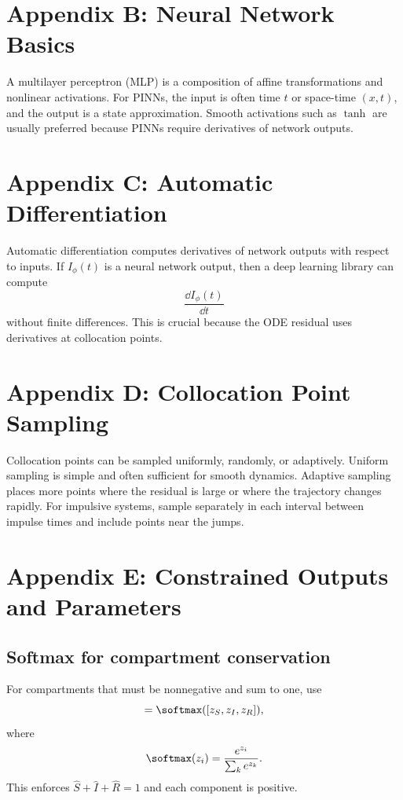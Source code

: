 \documentclass[11pt,a4paper]{article}
\begin{document}
\section{Appendix B: Neural Network Basics}
A multilayer perceptron (MLP) is a composition of affine transformations and nonlinear activations. For PINNs, the input is often time $t$ or space-time $(x,t)$, and the output is a state approximation. Smooth activations such as $\tanh$ are usually preferred because PINNs require derivatives of network outputs.

\section{Appendix C: Automatic Differentiation}
\label{app:autodiff}
Automatic differentiation computes derivatives of network outputs with respect to inputs. If $I_\phi(t)$ is a neural network output, then a deep learning library can compute
\begin{equation}
    \frac{\dd I_\phi(t)}{\dd t}
\end{equation}
without finite differences. This is crucial because the ODE residual uses derivatives at collocation points.

\section{Appendix D: Collocation Point Sampling}
Collocation points can be sampled uniformly, randomly, or adaptively. Uniform sampling is simple and often sufficient for smooth dynamics. Adaptive sampling places more points where the residual is large or where the trajectory changes rapidly. For impulsive systems, sample separately in each interval between impulse times and include points near the jumps.

\section{Appendix E: Constrained Outputs and Parameters}
\label{app:constraints}
\subsection{Softmax for compartment conservation}
For compartments that must be nonnegative and sum to one, use
\begin{equation}
    [\hat{S},\hat{I},\hat{R}]=\softmax([z_S,z_I,z_R]),
\end{equation}
where
\begin{equation}
    \softmax(z_i)=\frac{e^{z_i}}{\sum_k e^{z_k}}.
\end{equation}
This enforces $\hat{S}+\hat{I}+\hat{R}=1$ and each component is positive.
\end{document}
